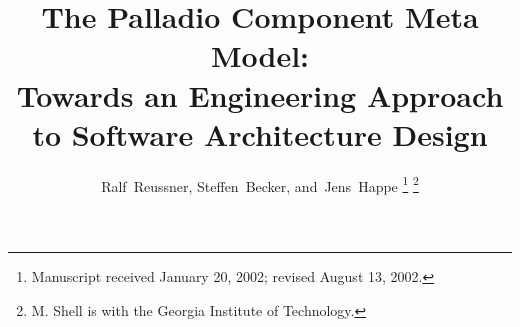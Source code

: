 \documentclass[journal,12pt]{IEEEtran}
\begin{document}
%
\title{The Palladio Component Meta Model:\\ Towards an Engineering Approach\\ to Software Architecture Design}
%
%
\author{Ralf~Reussner,
        Steffen~Becker,
        and~Jens~Happe%
\thanks{Manuscript received January 20, 2002; revised August 13, 2002.}%
\thanks{M. Shell is with the Georgia Institute of Technology.}}
% 
%
%




\maketitle
\end{document}
